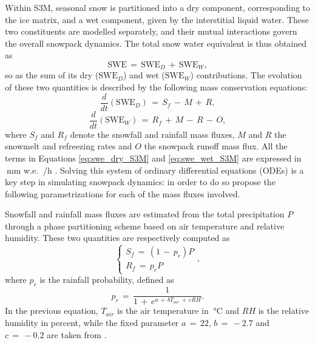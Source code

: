 Within S3M, seasonal snow is partitioned into a dry component, corresponding to the ice matrix, and a wet component, given by the interstitial liquid 
water. These two constituents are modelled separately, and their mutual interactions govern the overall snowpack dynamics. The total snow water equivalent 
is thus obtained as 
\begin{equation}
    \text{SWE}\,=\,\text{SWE}_D\,+\,\text{SWE}_W, 
    \label{eq:swe_tot_S3M}
\end{equation}
so as the sum of its dry ($\text{SWE}_D$) and wet ($\text{SWE}_W$) contributions. The evolution of these two quantities is described by the following mass 
conservation equations:
\begin{equation}
    \frac{d}{dt}\left(\text{SWE}_D\right)\,=\,S_f\,-\,M\,+\,R,
    \label{eq:swe_dry_S3M}
\end{equation}
\begin{equation}
    \frac{d}{dt}\left(\text{SWE}_W\right)\,=\,R_f\,+\,M\,-\,R\,-\,O,
    \label{eq:swe_wet_S3M}
\end{equation}
where $S_f$ and $R_f$ denote the snowfall and rainfall mass fluxes, $M$ and $R$ the snowmelt and refreezing rates and $O$ the snowpack runoff mass flux. 
All the terms in Equations \eqref{eq:swe_dry_S3M} and \eqref{eq:swe_wet_S3M} are expressed in $\SI{}{\milli\meter}$ w.e. $\SI{}{\per\hour}$ \parencite{S3M_model}. 
Solving this system of ordinary differential equations (ODEs) is a key step in simulating snowpack dynamics: in order to do so \textcite{S3M_model} propose 
the following parametrizations for each of the mass fluxes involved.

Snowfall and rainfall mass fluxes are estimated from the total precipitation $P$ through a phase partitioning scheme based on air 
temperature and relative humidity. These two quantities are respectively computed as 
\begin{equation}
    \begin{cases}
        S_f\,=\,\left(1\,-\,p_r\right) P \\
        R_f\,=\,p_rP
    \end{cases},
    \label{eq:snowfall_rainfall_S3M}
\end{equation}
where $p_r$ is the rainfall probability, defined as
\begin{equation}
    p_r\,=\,\frac{1}{1\,+\,e^{a\,+\,b T_{air}\,+\,c RH}}.
    \label{eq:rain_probability_S3M}
\end{equation}
In the previous equation, $ T_{air}$ is the air temperature in $\SI{}{\degreeCelsius}$ and $RH$ is the relative humidity in percent, 
while the fixed parameter $a\,=\,22$, $b\,=\,-2.7$ and $c\,=\,-0.2$ are taken from \textcite{S3M_phase_partitioning}. 


